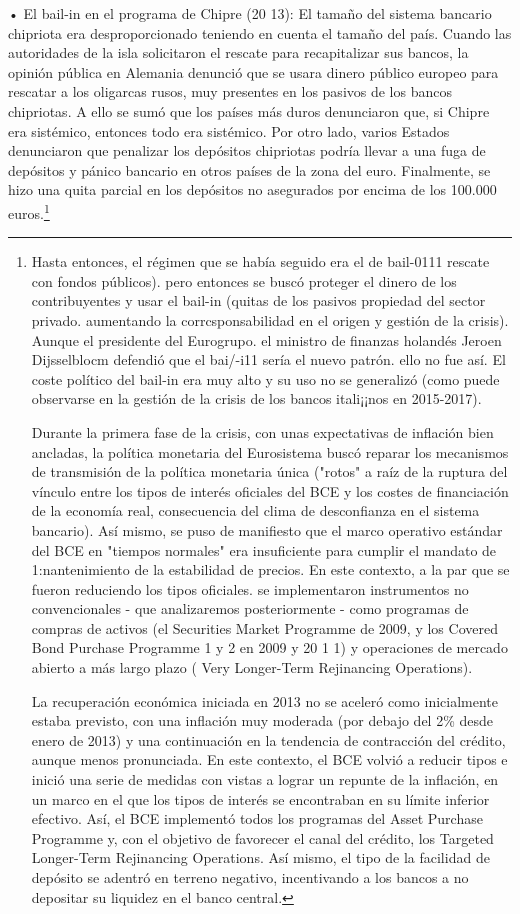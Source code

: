 \documentclass[10pt,a4paper]{article}
\begin{document}
• El bail-in en el programa de Chipre (20 13): El tamaño del sistema bancario chipriota era desproporcionado teniendo en cuenta el tamaño del país. Cuando las autoridades de la  isla solicitaron el rescate para recapitalizar sus bancos, la opinión pública en Alemania denunció que se usara dinero público europeo para rescatar a los oligarcas rusos, muy presentes en los pasivos de los bancos chipriotas. A ello se sumó que los países más duros denunciaron que, si Chipre era sistémico, entonces todo era sistémico. Por otro lado, varios Estados denunciaron que penalizar los depósitos chipriotas podría llevar a una fuga de depósitos y pánico bancario en otros países de la zona del euro. Finalmente, se hizo una quita parcial en los depósitos no asegurados por encima de los 100.000 euros.\footnote{Hasta entonces, el régimen que se había seguido era el de bail-0111 {rescate con fondos públicos). pero entonces se buscó proteger el dinero de los contribuyentes y usar el bail-in (quitas de los pasivos propiedad del sector privado. aumentando la corrcsponsabilidad en el origen y gestión de la crisis). Aunque el presidente del Eurogrupo. el ministro de finanzas holandés Jeroen Dijsselblocm defendió que el bai/-i11 sería el nuevo patrón. ello no fue así. El coste político del bail-in era muy alto y su uso no se generalizó (como puede observarse en la gestión de la crisis de los bancos itali¡¡nos en 2015-2017).
} 

Durante la primera fase de la crisis, con unas expectativas de inflación bien ancladas, la política monetaria del Eurosistema buscó reparar los mecanismos de transmisión de la política monetaria única ("rotos" a raíz de la ruptura del vínculo entre los tipos de interés oficiales del BCE y los costes de financiación de la economía real, consecuencia del clima de desconfianza en el sistema bancario). Así mismo, se puso de manifiesto que el marco operativo estándar del BCE en "tiempos normales" era insuficiente para cumplir el mandato de 1:nantenimiento de la estabilidad de precios. En este contexto, a la par que se fueron reduciendo los tipos oficiales. se implementaron instrumentos no convencionales - que analizaremos posteriormente - como programas de compras de activos (el Securities Market Programme de 2009, y los Covered Bond Purchase Programme 1 y 2 en 2009 y 20 1 1) y operaciones de mercado abierto a más largo plazo ( Very Longer-Term Rejinancing Operations).

La recuperación económica iniciada en 2013 no se aceleró como inicialmente estaba previsto, con una inflación muy moderada (por debajo del 2\% desde enero de 2013) y una continuación en la tendencia de contracción del crédito, aunque menos pronunciada. En este contexto, el BCE volvió a reducir tipos e inició una serie de medidas con vistas a lograr un repunte de la inflación, en un marco en el que los tipos de interés se encontraban en su límite inferior efectivo. Así, el BCE implementó todos los programas del Asset Purchase Programme y, con el objetivo de favorecer el canal del crédito, los Targeted Longer-Term Rejinancing Operations. Así mismo, el tipo de la facilidad de depósito se adentró en terreno negativo, incentivando a los bancos a no depositar su liquidez en el banco central. 

}
\end{document}
